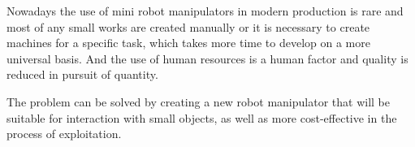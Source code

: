 Nowadays the use of mini robot manipulators in modern production is rare and most of any small works are created manually or it is necessary to create machines for a specific task, which takes more time to develop on a more universal basis. And the use of human resources is a human factor and quality is reduced in pursuit of quantity.

The problem can be solved by creating a new robot manipulator that will be suitable for interaction with small objects, as well as more cost-effective in the process of exploitation. 